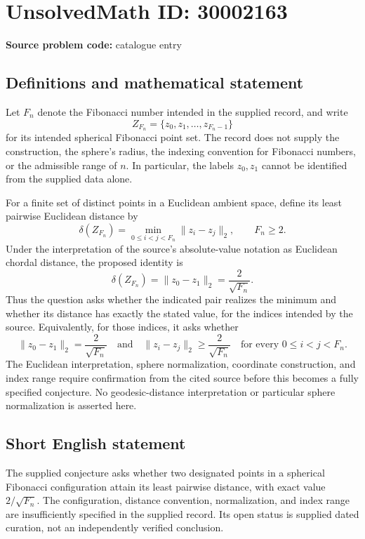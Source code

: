 \documentclass[11pt]{article}
\begin{document}
\section*{UnsolvedMath ID: 30002163}
\textbf{Source problem code:} catalogue entry
\subsection{Definitions and mathematical statement}
Let \(F_n\) denote the Fibonacci number intended in the supplied record, and write
\[
Z_{F_n}=\{z_0,z_1,\ldots,z_{F_n-1}\}
\]
for its intended spherical Fibonacci point set. The record does not supply the construction, the sphere's radius, the indexing convention for Fibonacci numbers, or the admissible range of \(n\). In particular, the labels \(z_0,z_1\) cannot be identified from the supplied data alone.

For a finite set of distinct points in a Euclidean ambient space, define its least pairwise Euclidean distance by
\[
\delta(Z_{F_n})=\min_{0\leq i<j<F_n}\|z_i-z_j\|_2,
\qquad F_n\geq 2.
\]
Under the interpretation of the source's absolute-value notation as Euclidean chordal distance, the proposed identity is
\[
\delta(Z_{F_n})=\|z_0-z_1\|_2=\frac{2}{\sqrt{F_n}}.
\]
Thus the question asks whether the indicated pair realizes the minimum and whether its distance has exactly the stated value, for the indices intended by the source. Equivalently, for those indices, it asks whether
\[
\|z_0-z_1\|_2=\frac{2}{\sqrt{F_n}}
\quad\text{and}\quad
\|z_i-z_j\|_2\geq\frac{2}{\sqrt{F_n}}
\quad\text{for every }0\leq i<j<F_n.
\]
The Euclidean interpretation, sphere normalization, coordinate construction, and index range require confirmation from the cited source before this becomes a fully specified conjecture. No geodesic-distance interpretation or particular sphere normalization is asserted here.
\subsection{Short English statement}
The supplied conjecture asks whether two designated points in a spherical Fibonacci configuration attain its least pairwise distance, with exact value \(2/\sqrt{F_n}\). The configuration, distance convention, normalization, and index range are insufficiently specified in the supplied record. Its open status is supplied dated curation, not an independently verified conclusion.
\end{document}
